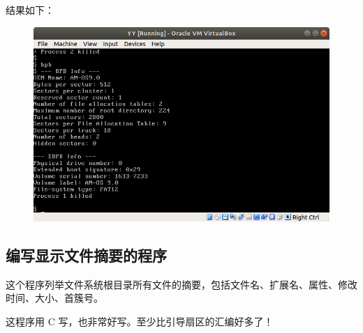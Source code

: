 \documentclass[a4paper]{article}
\begin{document}
结果如下：

\begin{figure}[!hbp]
\centering
\includegraphics[scale=0.5]{pics/12.png}
\end{figure}

\subsection{编写显示文件摘要的程序}

这个程序列举文件系统根目录所有文件的摘要，包括文件名、扩展名、属性、修改时间、大小、首簇号。

这程序用 C 写，也非常好写。至少比引导扇区的汇编好多了！
\end{document}
